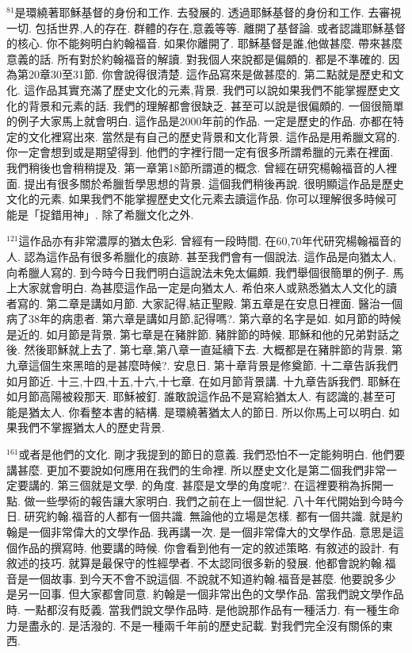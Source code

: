 \documentclass{book}
\begin{document}
$^{81}$是環繞著耶穌基督的身份和工作.
去發展的.
透過耶穌基督的身份和工作.
去審視一切.
包括世界,人的存在.
群體的存在,意義等等.
離開了基督論.
或者認識耶穌基督的核心.
你不能夠明白約翰福音.
如果你離開了.
耶穌基督是誰,他做甚麼.
帶來甚麼意義的話.
所有對於約翰福音的解讀.
對我個人來說都是偏頗的.
都是不準確的.
因為第20章30至31節.
你會說得很清楚.
這作品寫來是做甚麼的.
第二點就是歷史和文化.
這作品其實充滿了歷史文化的元素,背景.
我們可以說如果我們不能掌握歷史文化的背景和元素的話.
我們的理解都會很缺乏.
甚至可以說是很偏頗的.
一個很簡單的例子大家馬上就會明白.
這作品是2000年前的作品.
一定是歷史的作品.
亦都在特定的文化裡寫出來.
當然是有自己的歷史背景和文化背景.
這作品是用希臘文寫的.
你一定會想到或是期望得到.
他們的字裡行間一定有很多所謂希臘的元素在裡面.
我們稍後也會稍稍提及.
第一章第18節所謂道的概念.
曾經在研究楊翰福音的人裡面.
提出有很多關於希臘哲學思想的背景.
這個我們稍後再說.
很明顯這作品是歷史文化的元素.
如果我們不能掌握歷史文化元素去讀這作品.
你可以理解很多時候可能是「捉錯用神」.
除了希臘文化之外.

$^{121}$這作品亦有非常濃厚的猶太色彩.
曾經有一段時間.
在60,70年代研究楊翰福音的人.
認為這作品有很多希臘化的痕跡.
甚至我們會有一個說法.
這作品是向猶太人,向希臘人寫的.
到今時今日我們明白這說法未免太偏頗.
我們舉個很簡單的例子.
馬上大家就會明白.
為甚麼這作品一定是向猶太人.
希伯來人或熟悉猶太人文化的讀者寫的.
第二章是講如月節.
大家記得,結正聖殿.
第五章是在安息日裡面.
醫治一個病了38年的病患者.
第六章是講如月節,記得嗎?.
第六章的名字是如.
如月節的時候是近的.
如月節是背景.
第七章是在豬胖節.
豬胖節的時候.
耶穌和他的兄弟對話之後.
然後耶穌就上去了.
第七章,第八章一直延續下去.
大概都是在豬胖節的背景.
第九章這個生來黑暗的是甚麼時候?.
安息日.
第十章背景是修奠節.
十二章告訴我們如月節近.
十三,十四,十五,十六,十七章.
在如月節背景講.
十九章告訴我們.
耶穌在如月節高陽被殺那天.
耶穌被釘.
誰敢說這作品不是寫給猶太人.
有認識的,甚至可能是猶太人.
你看整本書的結構.
是環繞著猶太人的節日.
所以你馬上可以明白.
如果我們不掌握猶太人的歷史背景.

$^{161}$或者是他們的文化.
剛才我提到的節日的意義.
我們恐怕不一定能夠明白.
他們要講甚麼.
更加不要說如何應用在我們的生命裡.
所以歷史文化是第二個我們非常一定要講的.
第三個就是文學.
的角度.
甚麼是文學的角度呢?.
在這裡要稍為拆開一點.
做一些學術的報告讓大家明白.
我們之前在上一個世紀.
八十年代開始到今時今日.
研究約翰.福音的人都有一個共識.
無論他的立場是怎樣.
都有一個共識.
就是約翰是一個非常偉大的文學作品.
我再講一次.
是一個非常偉大的文學作品.
意思是這個作品的撰寫時.
他要講的時候.
你會看到他有一定的敘述策略.
有敘述的設計.
有敘述的技巧.
就算是最保守的性經學者.
不太認同很多新的發展.
他都會說約翰.福音是一個故事.
到今天不會不說這個.
不說就不知道約翰.福音是甚麼.
他要說多少是另一回事.
但大家都會同意.
約翰是一個非常出色的文學作品.
當我們說文學作品時.
一點都沒有貶義.
當我們說文學作品時.
是他說那作品有一種活力.
有一種生命力是盡永的.
是活潑的.
不是一種兩千年前的歷史記載.
對我們完全沒有關係的東西.
\end{document}

